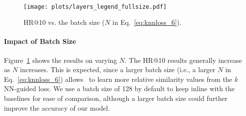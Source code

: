 \begin{figure}[ht]
     
    \hspace*{-2mm}
     \hspace*{-2mm}
     \\ \vspace{-2mm}

    \hspace*{-2mm}
    \hspace*{5mm}
    \texttt{[image: plots/layers\_legend\_fullsize.pdf]} \\

    \caption{HR@10 vs. the batch size ($N$ in Eq.~\eqref{eq:knnloss_6}).}\label{fig:exp_batchsizes}
\end{figure}

\paragraph{Impact of Batch Size} 
Figure~\ref{fig:exp_batchsizes} shows the results on varying $N$. The HR@10 results generally increase as $N$ increases. This is expected, since a larger batch size (i.e., a larger $N$ in Eq.~\eqref{eq:knnloss_6}) allows \model\ to learn more relative similarity values from the $k$NN-guided loss.
We use a batch size of 128 by default to keep inline with the baselines for ease of comparison, although a larger batch size could further improve the accuracy of our model.



